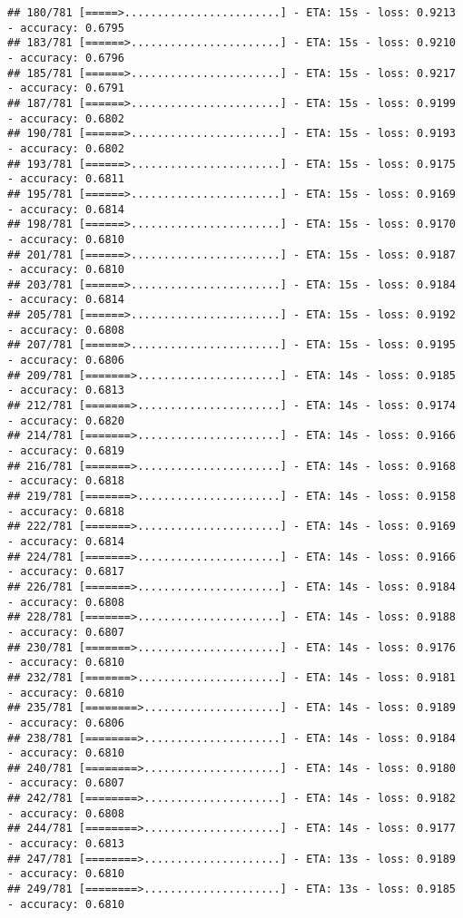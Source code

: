 \documentclass[
]{article}
\begin{document}
\begin{verbatim}
## 180/781 [=====>........................] - ETA: 15s - loss: 0.9213 - accuracy: 0.6795
## 183/781 [======>.......................] - ETA: 15s - loss: 0.9210 - accuracy: 0.6796
## 185/781 [======>.......................] - ETA: 15s - loss: 0.9217 - accuracy: 0.6791
## 187/781 [======>.......................] - ETA: 15s - loss: 0.9199 - accuracy: 0.6802
## 190/781 [======>.......................] - ETA: 15s - loss: 0.9193 - accuracy: 0.6802
## 193/781 [======>.......................] - ETA: 15s - loss: 0.9175 - accuracy: 0.6811
## 195/781 [======>.......................] - ETA: 15s - loss: 0.9169 - accuracy: 0.6814
## 198/781 [======>.......................] - ETA: 15s - loss: 0.9170 - accuracy: 0.6810
## 201/781 [======>.......................] - ETA: 15s - loss: 0.9187 - accuracy: 0.6810
## 203/781 [======>.......................] - ETA: 15s - loss: 0.9184 - accuracy: 0.6814
## 205/781 [======>.......................] - ETA: 15s - loss: 0.9192 - accuracy: 0.6808
## 207/781 [======>.......................] - ETA: 15s - loss: 0.9195 - accuracy: 0.6806
## 209/781 [=======>......................] - ETA: 14s - loss: 0.9185 - accuracy: 0.6813
## 212/781 [=======>......................] - ETA: 14s - loss: 0.9174 - accuracy: 0.6820
## 214/781 [=======>......................] - ETA: 14s - loss: 0.9166 - accuracy: 0.6819
## 216/781 [=======>......................] - ETA: 14s - loss: 0.9168 - accuracy: 0.6818
## 219/781 [=======>......................] - ETA: 14s - loss: 0.9158 - accuracy: 0.6818
## 222/781 [=======>......................] - ETA: 14s - loss: 0.9169 - accuracy: 0.6814
## 224/781 [=======>......................] - ETA: 14s - loss: 0.9166 - accuracy: 0.6817
## 226/781 [=======>......................] - ETA: 14s - loss: 0.9184 - accuracy: 0.6808
## 228/781 [=======>......................] - ETA: 14s - loss: 0.9188 - accuracy: 0.6807
## 230/781 [=======>......................] - ETA: 14s - loss: 0.9176 - accuracy: 0.6810
## 232/781 [=======>......................] - ETA: 14s - loss: 0.9181 - accuracy: 0.6810
## 235/781 [========>.....................] - ETA: 14s - loss: 0.9189 - accuracy: 0.6806
## 238/781 [========>.....................] - ETA: 14s - loss: 0.9184 - accuracy: 0.6810
## 240/781 [========>.....................] - ETA: 14s - loss: 0.9180 - accuracy: 0.6807
## 242/781 [========>.....................] - ETA: 14s - loss: 0.9182 - accuracy: 0.6808
## 244/781 [========>.....................] - ETA: 14s - loss: 0.9177 - accuracy: 0.6813
## 247/781 [========>.....................] - ETA: 13s - loss: 0.9189 - accuracy: 0.6810
## 249/781 [========>.....................] - ETA: 13s - loss: 0.9185 - accuracy: 0.6810

\end{verbatim}
\end{document}
